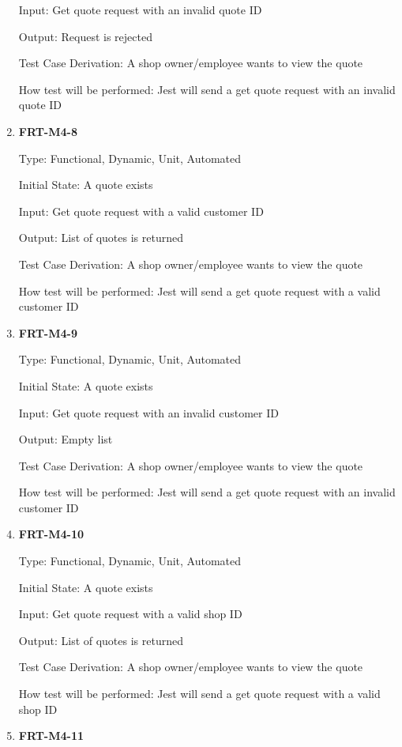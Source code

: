 \documentclass[12pt, titlepage]{article}
\begin{document}
\begin{enumerate}
	      Input: Get quote request with an invalid quote ID

	      Output: Request is rejected

	      Test Case Derivation: A shop owner/employee wants to view the quote

	      How test will be performed: Jest will send a get quote request with an invalid quote ID

	\item \textbf{FRT-M4-8}

	      Type: Functional, Dynamic, Unit, Automated

	      Initial State: A quote exists

	      Input: Get quote request with a valid customer ID

	      Output: List of quotes is returned

	      Test Case Derivation: A shop owner/employee wants to view the quote

	      How test will be performed: Jest will send a get quote request with a valid customer ID

	\item \textbf{FRT-M4-9}

	      Type: Functional, Dynamic, Unit, Automated

	      Initial State: A quote exists

	      Input: Get quote request with an invalid customer ID

	      Output: Empty list

	      Test Case Derivation: A shop owner/employee wants to view the quote

	      How test will be performed: Jest will send a get quote request with an invalid customer ID

	\item \textbf{FRT-M4-10}

	      Type: Functional, Dynamic, Unit, Automated

	      Initial State: A quote exists

	      Input: Get quote request with a valid shop ID

	      Output: List of quotes is returned

	      Test Case Derivation: A shop owner/employee wants to view the quote

	      How test will be performed: Jest will send a get quote request with a valid shop ID

	\item \textbf{FRT-M4-11}


\end{enumerate}
\end{document}
